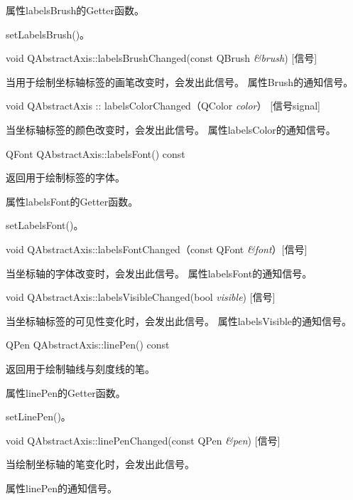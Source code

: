 \begin{notice}
属性labelsBrush的Getter函数。
\end{notice}

\begin{seeAlso}
setLabelsBrush()。
\end{seeAlso}


void QAbstractAxis::labelsBrushChanged(const QBrush \emph{\&brush}) [信号] 

当用于绘制坐标轴标签的画笔改变时，会发出此信号。 属性Brush的通知信号。

void QAbstractAxis :: labelsColorChanged（QColor \emph{color}） [信号signal] 

当坐标轴标签的颜色改变时，会发出此信号。 属性labelsColor的通知信号。

QFont QAbstractAxis::labelsFont() const 

返回用于绘制标签的字体。 

\begin{notice}
属性labelsFont的Getter函数。
\end{notice}

\begin{seeAlso}
setLabelsFont()。
\end{seeAlso}

void QAbstractAxis::labelsFontChanged（const QFont \emph{\&font}）[信号] 

当坐标轴的字体改变时，会发出此信号。 属性labelsFont的通知信号。

void QAbstractAxis::labelsVisibleChanged(bool \emph{visible}) [信号] 

当坐标轴标签的可见性变化时，会发出此信号。 属性labelsVisible的通知信号。

QPen QAbstractAxis::linePen() const 

返回用于绘制轴线与刻度线的笔。 

\begin{notice}
属性linePen的Getter函数。
\end{notice}

\begin{seeAlso}
setLinePen()。
\end{seeAlso}

void QAbstractAxis::linePenChanged(const QPen \emph{\&pen}) [信号] 

当绘制坐标轴的笔变化时，会发出此信号。 

\begin{notice}
属性linePen的通知信号。
\end{notice}

